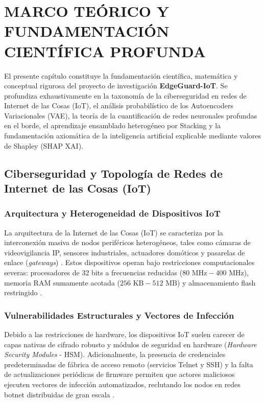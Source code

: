 \section{MARCO TEÓRICO Y FUNDAMENTACIÓN CIENTÍFICA PROFUNDA}

El presente capítulo constituye la fundamentación científica, matemática y conceptual rigurosa del proyecto de investigación \textbf{EdgeGuard-IoT}. Se profundiza exhaustivamente en la taxonomía de la ciberseguridad en redes de Internet de las Cosas (IoT), el análisis probabilístico de los Autoencoders Variacionales (VAE), la teoría de la cuantificación de redes neuronales profundas en el borde, el aprendizaje ensamblado heterogéneo por Stacking y la fundamentación axiomática de la inteligencia artificial explicable mediante valores de Shapley (SHAP XAI).

\subsection{Ciberseguridad y Topología de Redes de Internet de las Cosas (IoT)}

\subsubsection{Arquitectura y Heterogeneidad de Dispositivos IoT}
La arquitectura de la Internet de las Cosas (IoT) se caracteriza por la interconexión masiva de nodos periféricos heterogéneos, tales como cámaras de videovigilancia IP, sensores industriales, actuadores domóticos y pasarelas de enlace (\textit{gateways}) \citep{ciciot2023}. Estos dispositivos operan bajo restricciones computacionales severas: procesadores de 32 bits a frecuencias reducidas ($80\text{ MHz} - 400\text{ MHz}$), memoria RAM sumamente acotada ($256\text{ KB} - 512\text{ MB}$) y almacenamiento flash restringido \citep{albulayhi2022}.

\subsubsection{Vulnerabilidades Estructurales y Vectores de Infección}
Debido a las restricciones de hardware, los dispositivos IoT suelen carecer de capas nativas de cifrado robusto y módulos de seguridad en hardware (\textit{Hardware Security Modules} - HSM). Adicionalmente, la presencia de credenciales predeterminadas de fábrica de acceso remoto (servicios Telnet y SSH) y la falta de actualizaciones periódicas de firmware permiten que actores maliciosos ejecuten vectores de infección automatizados, reclutando los nodos en redes botnet distribuidas de gran escala \citep{hassan2025}.

